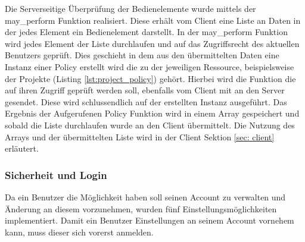 Die Serverseitige Überprüfung der Bedienelemente wurde mittels der may\_perform Funktion realisiert. Diese erhält vom Client eine Liste an Daten in der jedes Element ein Bedienelement darstellt. In der may\_perform Funktion wird jedes Element der Liste durchlaufen und auf das Zugriffsrecht des aktuellen Benutzers geprüft. Dies geschieht in dem aus den übermittelten Daten eine Instanz einer Policy erstellt wird die zu der jeweiligen Ressource, beispielsweise der Projekte (Listing \ref{lst:project_policy}) gehört. Hierbei wird die Funktion die auf ihren Zugriff geprüft werden soll, ebenfalls vom Client mit an den Server gesendet. Diese wird schlussendlich auf der erstellten Instanz ausgeführt. Das Ergebnis der Aufgerufenen Policy Funktion wird in einem Array gespeichert und sobald die Liste durchlaufen wurde an den Client übermittelt. Die Nutzung des Arrays und der übermittelten Liste wird in der Client Sektion \ref{sec: client} erläutert.

\subsubsection{Sicherheit und Login}
\label{sec:server-account-settings}
Da ein Benutzer die Möglichkeit haben soll seinen Account zu verwalten und Änderung an diesem vorzunehmen, wurden fünf Einstellungsmöglichkeiten implementiert. Damit ein Benutzer Einstellungen an seinem Account vornehem kann, muss dieser sich vorerst anmelden.

